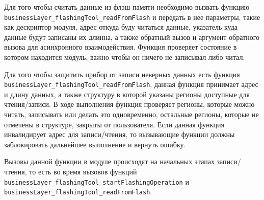 Для того чтобы считать данные из флэш памяти необходимо вызвать функцию \lstinline|businessLayer_flashingTool_readFromFlash| и передать в нее параметры, такие как
дескриптор модуля, адрес откуда буду читаться данные, указатель куда данные будут записаны их длинна, а также обратный вызов и аргумент обратного вызова для асинхронного
взаимодействия. Функция проверяет состояние в котором находится модуль, важно чтобы он ничего не записывал либо читал.

Для того чтобы защитить прибор от записи неверных данных есть функция \lstinline|businessLayer_flashingTool_readFromFlash|, данная функция принимает
адрес и длину данных, а также структуру в которой указаны регионы доступные для чтения/записи. В ходе выполнения функция
проверяет регионы, которые можно читать, записывать или делать это одновременно, остальные регионы, которые не отмечены в структуре, закрыты от пользователя.
Если данная функция инвалидирует адрес для записи/чтения, то вызывающие функции должны заблокировать дальнейшее выполнение и вернуть ошибку.

Вызовы данной функции в модуле происходят на начальных этапах записи/чтения, то есть во время вызовов функций \lstinline|businessLayer_flashingTool_startFlashingOperation| и
\lstinline|businessLayer_flashingTool_readFromFlash|.
